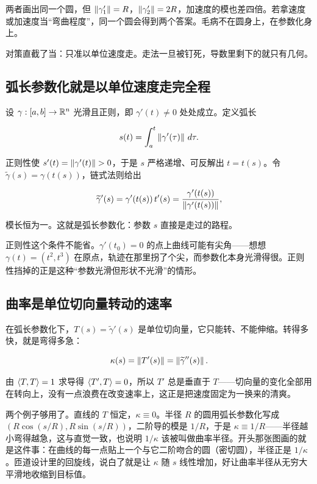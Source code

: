 两者画出同一个圆，但 \(\left\lVert\gamma_{1}'\right\rVert=R\)，\(\left\lVert\gamma_{2}'\right\rVert=2R\)，加速度的模也差四倍。若拿速度或加速度当``弯曲程度''，同一个圆会得到两个答案。毛病不在圆身上，在参数化身上。

对策直截了当：只准以单位速度走。走法一旦被钉死，导数里剩下的就只有几何。

\subsection{弧长参数化就是以单位速度走完全程}

设 \(\gamma:[a,b]\to\mathbb{R}^{n}\) 光滑且正则，即 \(\gamma'(t)\neq0\) 处处成立。定义弧长

\[
s(t)=\int_{a}^{t}\left\lVert\gamma'(\tau)\right\rVert\,d\tau.
\]

正则性使 \(s'(t)=\left\lVert\gamma'(t)\right\rVert>0\)，于是 \(s\) 严格递增、可反解出 \(t=t(s)\)。令 \(\widetilde\gamma(s)=\gamma(t(s))\)，链式法则给出

\[
\widetilde\gamma'(s)=\gamma'(t(s))\,t'(s)=\frac{\gamma'(t(s))}{\left\lVert\gamma'(t(s))\right\rVert},
\]

模长恒为一。这就是弧长参数化：参数 \(s\) 直接是走过的路程。

正则性这个条件不能省。\(\gamma'(t_{0})=0\) 的点上曲线可能有尖角——想想 \(\gamma(t)=(t^{2},t^{3})\) 在原点，轨迹在那里拐了个尖，而参数化本身光滑得很。正则性挡掉的正是这种``参数光滑但形状不光滑''的情形。

\subsection{曲率是单位切向量转动的速率}

在弧长参数化下，\(T(s)=\widetilde\gamma'(s)\) 是单位切向量，它只能转、不能伸缩。转得多快，就是弯得多急：

\[
\kappa(s)=\left\lVert T'(s)\right\rVert=\left\lVert\widetilde\gamma''(s)\right\rVert.
\]

由 \(\left\langle T,T\right\rangle=1\) 求导得 \(\left\langle T',T\right\rangle=0\)，所以 \(T'\) 总是垂直于 \(T\)——切向量的变化全部用在转向上，没有一点浪费在改变速率上，这正是把速度固定为一换来的清爽。

两个例子够用了。直线的 \(T\) 恒定，\(\kappa\equiv0\)。半径 \(R\) 的圆用弧长参数化写成 \((R\cos(s/R),R\sin(s/R))\)，二阶导的模是 \(1/R\)，于是 \(\kappa\equiv1/R\)——半径越小弯得越急，这与直觉一致，也说明 \(1/\kappa\) 该被叫做曲率半径。开头那张图画的就是这件事：在曲线的每一点贴上一个与它二阶吻合的圆（密切圆），半径正是 \(1/\kappa\)。匝道设计里的回旋线，说白了就是让 \(\kappa\) 随 \(s\) 线性增加，好让曲率半径从无穷大平滑地收缩到目标值。

